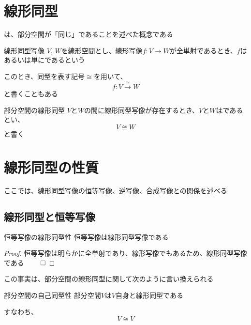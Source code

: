 \documentclass[../../../topic_linear-algebra]{subfiles}
\begin{document}
\sectionline
\section{線形同型}

は、部分空間が「同じ」であることを述べた概念である

\begin{definition}{線形同型写像}
  $V,\,W$を線形空間とし、線形写像$f\colon V \to W$が全単射であるとき、$f$はあるいは単にであるという

  このとき、同型を表す記号$\cong$を用いて、
  \begin{equation*}
    f\colon V \xrightarrow{\cong} W
  \end{equation*}
  と書くこともある
\end{definition}

\begin{definition}{部分空間の線形同型}\label{def:linear-subspace-isomorphism}
  $V$と$W$の間に線形同型写像が存在するとき、$V$と$W$はであるとい、
  \begin{equation*}
    V \cong W
  \end{equation*}
  と書く
\end{definition}

\sectionline
\section{線形同型の性質}

ここでは、線形同型写像の恒等写像、逆写像、合成写像との関係を述べる

\subsection{線形同型と恒等写像}

\begin{theorem}{恒等写像の線形同型性}
  恒等写像は線形同型写像である
\end{theorem}

\begin{proof}
  恒等写像は明らかに全単射であり、線形写像でもあるため、線形同型写像である $\qed$
\end{proof}

この事実は、部分空間の線形同型に関して次のように言い換えられる

\begin{theorem}{部分空間の自己同型性}
  部分空間$V$は$V$自身と線形同型である

  すなわち、
  \begin{equation*}
    V \cong V
  \end{equation*}
\end{theorem}
\end{document}
